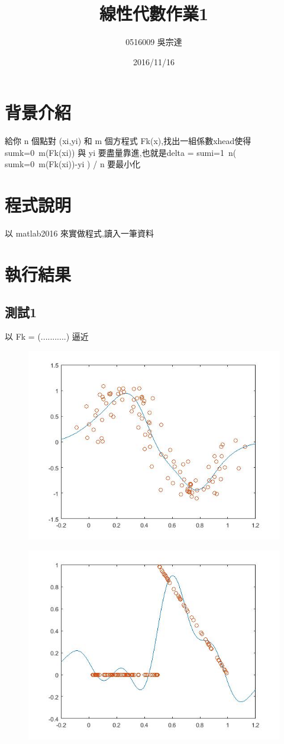\documentclass[a4paper]{article}
\title{線性代數作業1}
\author{0516009 吳宗達}
\date{2016/11/16}
\begin{document}
\large
{}
\maketitle

\section{背景介紹}
給你 n 個點對 (xi,yi) 和 m 個方程式 Fk(x),找出一組係數xhead使得sumk=0~m(Fk(xi)) 與 yi 要盡量靠進,也就是delta = sumi=1~n( sumk=0~m(Fk(xi))-yi ) / n 要最小化

\section{程式說明}
以 matlab2016 來實做程式,讀入一筆資料

\section{執行結果}
\subsection{測試1}
以 Fk = (...........) 逼近
\begin{figure}[!htbp]
	\centering
	\includegraphics[width=.8\linewidth]{Figure11.jpg}
\end{figure}
\begin{figure}[!htbp]
	\centering
	\includegraphics[width=.8\linewidth]{Figure12.jpg}
\end{figure}
\newpage
\end{document}
